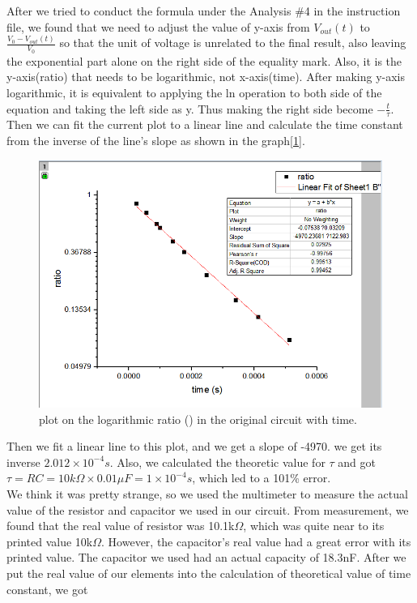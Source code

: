 \phantom{ } After we tried to conduct the formula under the Analysis \#4 in the instruction file, we found that we need to adjust the value of y-axis from $V_{out}(t)$ to $\frac{V_0 - V_{out}(t)}{V_0}$ so that the unit of voltage is unrelated to the final result, also leaving the exponential part alone on the right side of the equality mark. Also, it is the y-axis(ratio) that needs to be logarithmic, not x-axis(time). After making y-axis logarithmic, it is equivalent to applying the ln operation to both side of the equation and taking the left side as y. Thus making the right side become $-\frac{t}{\tau}$. Then we can fit the current plot to a linear line and calculate the time constant from the inverse of the line's slope as shown in the graph[\ref{fig:2.2}].\\
\begin{figure}[htbp]
	\centering %
	\includegraphics[width=\linewidth]{images/2_2.PNG} %
	\caption{plot on the logarithmic ratio ({\tiny }) in the original circuit with time.} %
	\label{fig:2.2} %
\end{figure}
\phantom{ } Then we fit a linear line to this plot, and we get a slope of -4970.
we get its inverse $2.012\times10^{-4}s$. Also, we calculated the theoretic value for $\tau$ and got 
$\tau = RC = 10k\Omega \times 0.01\mu F = 1\times10^{-4}s$, which led to a 101\% error.\\
We think it was pretty strange, so we used the multimeter to measure the actual value of the resistor and capacitor we used in our circuit. From measurement, we found that the real value of resistor was 10.1k$\Omega$, which was quite near to its printed value 10k$\Omega$. However, the capacitor's real value had a great error with its printed value. The capacitor we used had an actual capacity of 18.3nF. After we put the real value of our elements into the calculation of theoretical value of time constant, we got \\
